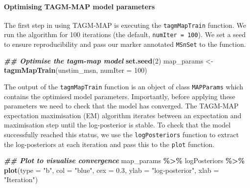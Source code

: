 \documentclass[9pt,a4paper,]{extarticle}
\newenvironment{Shaded}{\begin{snugshade}}{\end{snugshade}}
\newcommand{\AttributeTok}[1]{\textcolor[rgb]{0.13,0.29,0.53}{#1}}
\newcommand{\DecValTok}[1]{\textcolor[rgb]{0.00,0.00,0.81}{#1}}
\newcommand{\DocumentationTok}[1]{\textcolor[rgb]{0.56,0.35,0.01}{\textbf{\textit{#1}}}}
\newcommand{\FloatTok}[1]{\textcolor[rgb]{0.00,0.00,0.81}{#1}}
\newcommand{\FunctionTok}[1]{\textcolor[rgb]{0.13,0.29,0.53}{\textbf{#1}}}
\newcommand{\NormalTok}[1]{#1}
\newcommand{\OtherTok}[1]{\textcolor[rgb]{0.56,0.35,0.01}{#1}}
\newcommand{\SpecialCharTok}[1]{\textcolor[rgb]{0.81,0.36,0.00}{\textbf{#1}}}
\newcommand{\StringTok}[1]{\textcolor[rgb]{0.31,0.60,0.02}{#1}}
\begin{document}
\paragraph{Optimising TAGM-MAP model parameters}\label{optimising-tagm-map-model-parameters}

The first step in using TAGM-MAP is executing the \texttt{tagmMapTrain} function. We
run the algorithm for 100 iterations (the default, \texttt{numIter\ =\ 100}). We set a
seed to ensure reproducibility and pass our marker annotated \texttt{MSnSet} to the
function.

\begin{Shaded}
\begin{Highlighting}[]
\DocumentationTok{\#\# Optimise the tagm{-}map model}
\FunctionTok{set.seed}\NormalTok{(}\DecValTok{2}\NormalTok{)}
\NormalTok{map\_params }\OtherTok{\textless{}{-}} \FunctionTok{tagmMapTrain}\NormalTok{(unstim\_msn, }\AttributeTok{numIter =} \DecValTok{100}\NormalTok{)}
\end{Highlighting}
\end{Shaded}

The output of the \texttt{tagmMapTrain} function is an object of class \texttt{MAPParams}
which contains the optimised model parameters. Importantly, before applying
these parameters we need to check that the model has converged. The TAGM-MAP
expectation maximisation (EM) algorithm iterates between an expectation and
maximisation step until the log-posterior is stable. To check that the model
successfully reached this status, we use the \texttt{logPosteriors} function to extract
the log-posteriors at each iteration and pass this to the \texttt{plot} function.

\begin{Shaded}
\begin{Highlighting}[]
\DocumentationTok{\#\# Plot to visualise convergence}
\NormalTok{map\_params }\SpecialCharTok{\%\textgreater{}\%}
\NormalTok{  logPosteriors }\SpecialCharTok{\%\textgreater{}\%} 
  \FunctionTok{plot}\NormalTok{(}\AttributeTok{type =} \StringTok{"b"}\NormalTok{, }\AttributeTok{col =} \StringTok{"blue"}\NormalTok{, }\AttributeTok{cex =} \FloatTok{0.3}\NormalTok{, }
       \AttributeTok{ylab =} \StringTok{"log{-}posterior"}\NormalTok{, }
       \AttributeTok{xlab =} \StringTok{"Iteration"}\NormalTok{)}
\end{Highlighting}
\end{Shaded}
\end{document}
